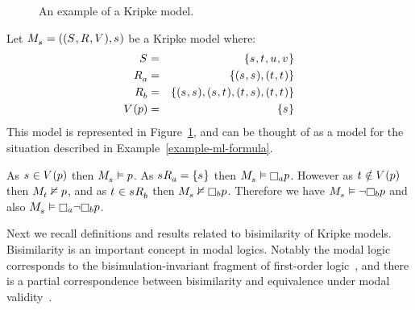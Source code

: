 \begin{example}
\begin{figure}
    \caption{An example of a Kripke model.}\label{example-kripke-model}
    \centering
\end{figure}

Let $\kPModelAndTuple{\kStateS}$ be a Kripke model where:
\begin{eqnarray*}
    \kStates &=& \{\kStateS, \kStateT, \kStateU, \kStateV\}\\
    \kAccessibilityA &=& \{(\kStateS, \kStateS), (\kStateT, \kStateT)\}\\
    \kAccessibilityB &=& \{(\kStateS, \kStateS), (\kStateS, \kStateT), (\kStateT, \kStateS), (\kStateT, \kStateT)\}\\
    \kValuation(\atomP) &=& \{\kStateS\}
\end{eqnarray*}
This model is represented in Figure~\ref{example-kripke-model}, and can be thought of as a model for the situation described in Example~\ref{example-ml-formula}.

As $\kStateS \in \kValuation(\atomP)$ then $\kPModel{\kStateS} \entails \atomP$.
As $\kSuccessorsA{\kStateS} = \{\kStateS\}$ then $\kPModel{\kStateS} \entails \necessaryA \atomP$.
However as $\kStateT \notin \kValuation(\atomP)$ then $\kPModel{\kStateT} \nentails \atomP$,
and as $\kStateT \in \kSuccessorsB{\kStateS}$ then $\kPModel{\kStateS} \nentails \necessaryB \atomP$.
Therefore we have $\kPModel{\kStateS} \entails \lnot \necessaryB \atomP$ and also $\kPModel{\kStateS} \entails \necessaryA \lnot \necessaryB \atomP$.

\end{example}

Next we recall definitions and results related to bisimilarity of Kripke models.
Bisimilarity is an important concept in modal logics.
Notably the modal logic \logicK{} corresponds to the bisimulation-invariant fragment of first-order logic~\cite{vanbenthem:1984}, and there is a partial correspondence between bisimilarity and equivalence under modal validity~\cite{goranko:2006}.


